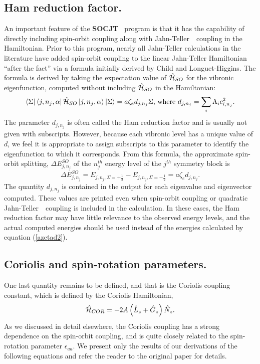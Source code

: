 \documentclass{article}
\newcommand{\JT}{Jahn-Teller\ }
\newcommand{\socjt}{{\bf SOCJT }}
\begin{document}
\subsection{Ham reduction factor.} An important feature of the \socjt\
program is that it has the 
capability of directly including spin-orbit coupling along with \JT\
coupling in the Hamiltonian. Prior to this program, nearly all
Jahn-Teller calculations in the literature have added spin-orbit 
coupling to the linear Jahn-Teller Hamiltonian ``after the fact'' via a
formula initially derived by Child and Longuet-Higgins.\cite{jttheory9} The
formula is derived by taking the expectation value of $\hat{\cal H}_{SO}$ 
for the vibronic eigenfunction, computed without including $\hat{\cal H}_{SO}$
in the Hamiltonian: 
\begin{equation}
\left\langle \Sigma \right|
\left\langle j,n_{j},\alpha \right| \hat{\cal H}_{SO}
\left| j,n_{j},\alpha \right\rangle \left| \Sigma \right\rangle
=a\zeta _{e}d_{j,n_{j}}\Sigma \text{, where
  }d_{j,n_{j}}=\sum_i\Lambda 
_ic_{i,n_{j}}^{2}.  \label{ham parm definition}
\end{equation}
The parameter $d_{j,n_{j}}$ is often called the Ham reduction factor and is usually
not given with subscripts. However, because each
vibronic level has a unique value of $d$, we feel it is appropriate to
assign subscripts to this parameter to identify the eigenfunction to which
it corresponds. From this formula, the approximate spin-orbit
splitting, $\Delta E_{j,n_j}^{SO}$ of the $n_{j}^{th}$ energy level of
the $j^{th}$ symmetry block is  
\begin{equation}
\Delta E_{j,n_{j}}^{SO}= E_{j,n_j,\Sigma = +\frac12 } - 
E_{j,n_j,\Sigma = -\frac12 } = a\zeta _{e}d_{j,n_{j}}.  \label{azetad2}
\end{equation}
The quantity $d_{j,n_{j}}$ is contained in the output for each
eigenvalue and eigenvector computed. These values are printed even
when spin-orbit coupling or quadratic \JT\ coupling is included in the
calculation. In these cases, the Ham reduction factor may have little
relevance to the observed energy levels, and the actual computed
energies should be used instead of the energies calculated by equation
(\ref{azetad2}). 

\subsection{Coriolis and spin-rotation parameters.} 
One last quantity remains to be defined, and that is the Coriolis
coupling constant, which is defined by the Coriolis Hamiltonian,
\begin{equation}
\hat{\cal H}_{COR} = -2A \left( \hat{L}_z + \hat{G}_z \right)
\hat{N}_z .
\label{HCOR}
\end{equation}
As we discussed in detail elsewhere,\cite{tab4,tab11} the Coriolis
coupling has a strong dependence on the spin-orbit coupling, and is
quite closely related to the spin-rotation parameter $\epsilon
_{aa}$. We present only the results of our derivations of the
following equations and refer the reader to the original
paper\cite{tab4} for details. 
\end{document}
